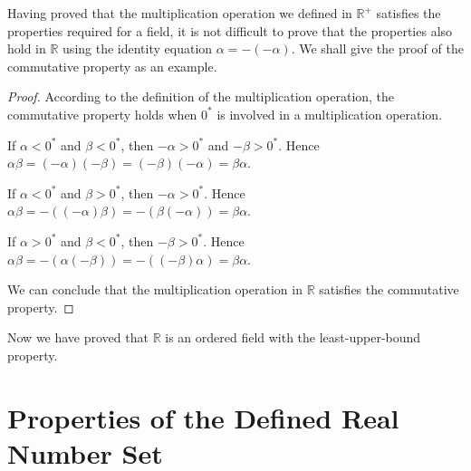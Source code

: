 \documentclass{article}
\begin{document}
Having proved that the multiplication operation we defined in $\mathbb{R^+}$ 
satisfies the properties required for a field, it is not difficult to prove that 
the properties also hold in $\mathbb{R}$ using the identity equation 
$\alpha = -(-\alpha)$. We shall give the proof of the commutative property as an 
example.
\begin{proof}
  According to the definition of the multiplication operation, the commutative 
  property holds when $0^*$ is involved in a multiplication operation.

  If $\alpha < 0^*$ and $\beta < 0^*$, then $-\alpha > 0^*$ and $-\beta > 0^*$. 
  Hence $\alpha \beta = (-\alpha)(-\beta) = (-\beta)(-\alpha) = \beta \alpha$.

  If $\alpha < 0^*$ and $\beta > 0^*$, then $-\alpha > 0^*$. Hence 
  $\alpha \beta = -((-\alpha)\beta) = -(\beta(-\alpha)) = \beta \alpha$.

  If $\alpha > 0^*$ and $\beta < 0^*$, then $-\beta > 0^*$. Hence 
  $\alpha \beta = -(\alpha(-\beta)) = -((-\beta)\alpha) = \beta \alpha$.

  We can conclude that the multiplication operation in $\mathbb{R}$ satisfies 
  the commutative property.
\end{proof}

Now we have proved that $\mathbb{R}$ is an ordered field with the 
least-upper-bound property.

\section{Properties of the Defined Real Number Set}
\end{document}

